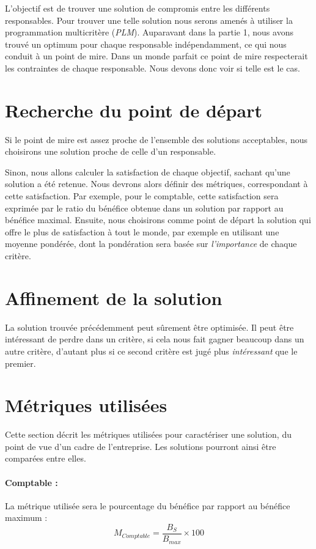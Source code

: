 
L'objectif est de trouver une solution de compromis entre les différents responsables.
Pour trouver une telle solution nous serons amenés à utiliser la programmation multicritère (\emph{PLM}).
Auparavant dans la partie 1, nous avons trouvé un optimum pour chaque
responsable indépendam\-ment, ce qui nous conduit à un point de mire. Dans un
monde parfait ce point de mire respecterait les contraintes de chaque
responsable. Nous devons donc voir si telle est le cas. 


\section{Recherche du point de départ}
Si le point de mire est assez proche de l'ensemble des solutions acceptables,
nous choisirons une solution proche de celle d'un responsable.

Sinon, nous allons calculer la satisfaction de chaque objectif, sachant qu'une
solution a été retenue. Nous devrons alors définir des métriques, correspondant
à cette satisfaction. Par exemple, pour le comptable, cette satisfaction sera
exprimée par le ratio du bénéfice obtenue dans un solution par rapport au
bénéfice maximal.
Ensuite, nous choisirons comme point de départ la solution qui offre le plus de
satisfaction à tout le monde, par exemple en utilisant une moyenne pondérée,
dont la pondération sera basée sur \emph{l'importance} de chaque critère.

\section{Affinement de la solution}
La solution trouvée précédemment peut sûrement être optimisée. Il peut être
intéressant de perdre dans un critère, si cela nous fait gagner beaucoup dans
un autre critère, d'autant plus si ce second critère est jugé plus
\emph{intéressant} que le premier.

\section{Métriques utilisées}
Cette section décrit les métriques utilisées pour caractériser une solution, du
point de vue d'un cadre de l'entreprise. Les solutions pourront ainsi être
comparées entre elles.

\paragraph{Comptable :}
La métrique utilisée sera le pourcentage du bénéfice par rapport au bénéfice
maximum :
$$
M_{Comptable} = \frac{B_{S}}{B_{max}} \times 100
$$


